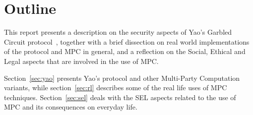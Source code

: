 \section{Outline}

This report presents a description on the security aspects of Yao's Garbled Circuit protocol~\cite{yao86}, together with a brief dissection on real world implementations of the protocol and MPC in general, and a reflection on the Social, Ethical and Legal aspects that are involved in the use of MPC.

Section~\ref{sec:yao} presents Yao's protocol and other Multi-Party Computation variants, while section~\ref{sec:rl} describes some of the real life uses of MPC techniques. Section~\ref{sec:sel} deals with the SEL aspects related to the use of MPC and its consequences on everyday life.